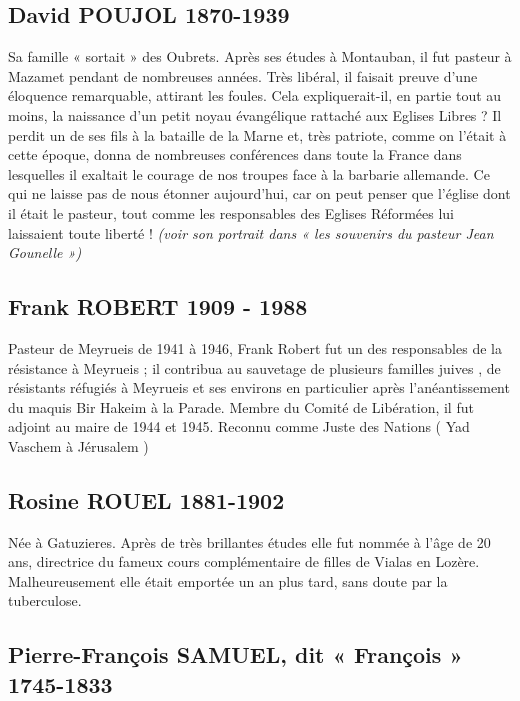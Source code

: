 \subsection*{David POUJOL 1870-1939}

Sa famille « sortait » des Oubrets. Après ses études à Montauban, il fut pasteur à
Mazamet pendant de nombreuses années. Très libéral, il faisait preuve d’une
éloquence remarquable, attirant les foules. Cela expliquerait-il, en partie tout au
moins, la naissance d’un petit noyau évangélique rattaché aux Eglises Libres ?
Il perdit un de ses fils à la bataille de la Marne et, très patriote, comme on l’était à
cette époque, donna de nombreuses conférences dans toute la France dans lesquelles
il exaltait le courage de nos troupes face à la barbarie allemande. Ce qui ne laisse pas
de nous étonner aujourd’hui, car on peut penser que l’église dont il était le pasteur,
tout comme les responsables des Eglises Réformées lui laissaient toute liberté !
\emph{(voir son portrait dans « les souvenirs du pasteur Jean Gounelle »)}

\subsection*{Frank ROBERT \hspace{1em} 1909 - 1988}

Pasteur de Meyrueis de 1941 à 1946, Frank Robert fut un des responsables de la
résistance à Meyrueis ; il contribua au sauvetage de plusieurs familles juives , de
résistants réfugiés à Meyrueis et ses environs en particulier après l’anéantissement
du maquis Bir Hakeim à la Parade.
Membre du Comité de Libération, il fut adjoint au maire de 1944 et 1945.
Reconnu comme Juste des Nations ( Yad Vaschem à Jérusalem )

\subsection*{Rosine ROUEL 1881-1902}

Née à Gatuzieres. Après de très brillantes études elle fut nommée à l’âge de 20
ans, directrice du fameux cours complémentaire de filles de Vialas en Lozère.
Malheureusement elle était emportée un an plus tard, sans doute par la tuberculose.

\subsection*{Pierre-François SAMUEL, dit « François » \hspace{1em} 1745-1833}

